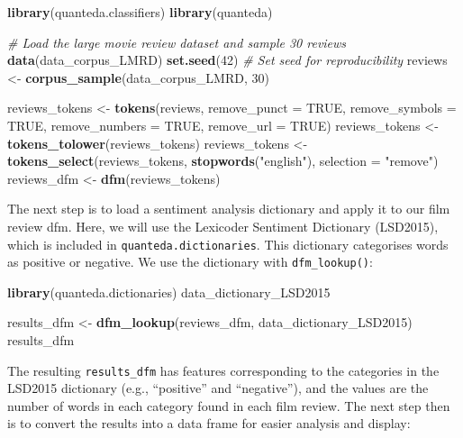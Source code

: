\documentclass[
]{book}
\newenvironment{Shaded}{\begin{snugshade}}{\end{snugshade}}
\newcommand{\AttributeTok}[1]{\textcolor[rgb]{0.13,0.29,0.53}{#1}}
\newcommand{\CommentTok}[1]{\textcolor[rgb]{0.56,0.35,0.01}{\textit{#1}}}
\newcommand{\ConstantTok}[1]{\textcolor[rgb]{0.56,0.35,0.01}{#1}}
\newcommand{\DecValTok}[1]{\textcolor[rgb]{0.00,0.00,0.81}{#1}}
\newcommand{\FunctionTok}[1]{\textcolor[rgb]{0.13,0.29,0.53}{\textbf{#1}}}
\newcommand{\NormalTok}[1]{#1}
\newcommand{\OtherTok}[1]{\textcolor[rgb]{0.56,0.35,0.01}{#1}}
\newcommand{\StringTok}[1]{\textcolor[rgb]{0.31,0.60,0.02}{#1}}
\begin{document}
\begin{Shaded}
\begin{Highlighting}[]
\FunctionTok{library}\NormalTok{(quanteda.classifiers)}
\FunctionTok{library}\NormalTok{(quanteda)}

\CommentTok{\# Load the large movie review dataset and sample 30 reviews}
\FunctionTok{data}\NormalTok{(data\_corpus\_LMRD)}
\FunctionTok{set.seed}\NormalTok{(}\DecValTok{42}\NormalTok{)  }\CommentTok{\# Set seed for reproducibility}
\NormalTok{reviews }\OtherTok{\textless{}{-}} \FunctionTok{corpus\_sample}\NormalTok{(data\_corpus\_LMRD, }\DecValTok{30}\NormalTok{)}

\NormalTok{reviews\_tokens }\OtherTok{\textless{}{-}} \FunctionTok{tokens}\NormalTok{(reviews, }\AttributeTok{remove\_punct =} \ConstantTok{TRUE}\NormalTok{, }\AttributeTok{remove\_symbols =} \ConstantTok{TRUE}\NormalTok{, }\AttributeTok{remove\_numbers =} \ConstantTok{TRUE}\NormalTok{,}
    \AttributeTok{remove\_url =} \ConstantTok{TRUE}\NormalTok{)}
\NormalTok{reviews\_tokens }\OtherTok{\textless{}{-}} \FunctionTok{tokens\_tolower}\NormalTok{(reviews\_tokens)}
\NormalTok{reviews\_tokens }\OtherTok{\textless{}{-}} \FunctionTok{tokens\_select}\NormalTok{(reviews\_tokens, }\FunctionTok{stopwords}\NormalTok{(}\StringTok{"english"}\NormalTok{), }\AttributeTok{selection =} \StringTok{"remove"}\NormalTok{)}
\NormalTok{reviews\_dfm }\OtherTok{\textless{}{-}} \FunctionTok{dfm}\NormalTok{(reviews\_tokens)}
\end{Highlighting}
\end{Shaded}

The next step is to load a sentiment analysis dictionary and apply it to our film review dfm. Here, we will use the Lexicoder Sentiment Dictionary (LSD2015), which is included in \texttt{quanteda.dictionaries}. This dictionary categorises words as positive or negative. We use the dictionary with \texttt{dfm\_lookup()}:

\begin{Shaded}
\begin{Highlighting}[]
\FunctionTok{library}\NormalTok{(quanteda.dictionaries)}
\NormalTok{data\_dictionary\_LSD2015}

\NormalTok{results\_dfm }\OtherTok{\textless{}{-}} \FunctionTok{dfm\_lookup}\NormalTok{(reviews\_dfm, data\_dictionary\_LSD2015)}
\NormalTok{results\_dfm}
\end{Highlighting}
\end{Shaded}

The resulting \texttt{results\_dfm} has features corresponding to the categories in the LSD2015 dictionary (e.g., ``positive'' and ``negative''), and the values are the number of words in each category found in each film review. The next step then is to convert the results into a data frame for easier analysis and display:
\end{document}
